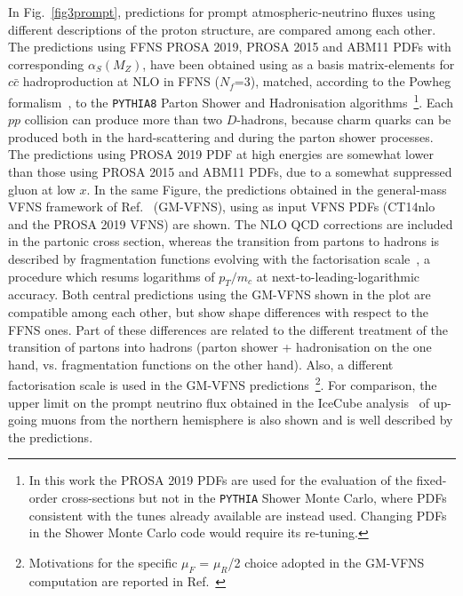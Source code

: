 \documentclass[12pt]{article}
\begin{document}
In Fig.~\ref{fig3prompt}, predictions for prompt atmospheric-neutrino fluxes using different descriptions of the proton structure, are compared among each other. The predictions using FFNS PROSA 2019, PROSA 2015 and ABM11 PDFs with corresponding $\alpha_S(M_Z)$, have been obtained using as a basis matrix-elements for $c\bar{c}$ hadroproduction at NLO in FFNS ($N_f$=3), matched, according to the Powheg formalism~\cite{Nason:2004rx, Frixione:2007nw}, to the {\texttt{PYTHIA8}} Parton Shower and Hadronisation algorithms~\cite{Sjostrand:2014zea}\footnote{In this work the PROSA 2019 PDFs are used for the evaluation of the fixed-order cross-sections but not in the {\texttt{PYTHIA}} Shower Monte Carlo, where PDFs consistent with the tunes already available are instead used. Changing PDFs in the Shower Monte Carlo code would require its re-tuning.}. Each $pp$ collision can produce more than two $D$-hadrons, because charm quarks can be produced both in the hard-scattering and during the parton shower processes. 
The predictions using PROSA 2019 PDF at high energies are somewhat lower than those using PROSA 2015 and ABM11 PDFs, due to a somewhat suppressed gluon at low $x$. 
In the same Figure, the predictions obtained in the general-mass VFNS framework of Ref.~\cite{Benzke:2017yjn} (GM-VFNS), using as input 
VFNS PDFs (CT14nlo and the PROSA 2019 VFNS) are shown. The NLO QCD corrections are included in the partonic cross section, whereas the transition from partons to hadrons is described by fragmentation functions evolving with the factorisation scale~\cite{Kneesch:2007ey}, 
a procedure which resums logarithms of $p_T/m_c$ at next-to-leading-logarithmic accuracy. Both central predictions using the GM-VFNS shown in the plot are compatible among each other, but show shape differences with respect to the FFNS ones. Part of these differences are related to the different treatment of the transition of partons into hadrons (parton shower + hadronisation on the one hand, vs. fragmentation functions on the other hand). Also, a different factorisation scale is used in the GM-VFNS predictions~\footnote{Motivations for the specific $\mu_F$ = $\mu_R$/2 choice adopted in the GM-VFNS computation are reported in Ref.~\cite{Benzke:2017yjn} }. For comparison, the upper limit on the prompt neutrino flux obtained in the IceCube analysis~\cite{Aartsen:2016xlq} of up-going muons 
from the northern hemisphere is also shown and is well described by the predictions. 
\end{document}
